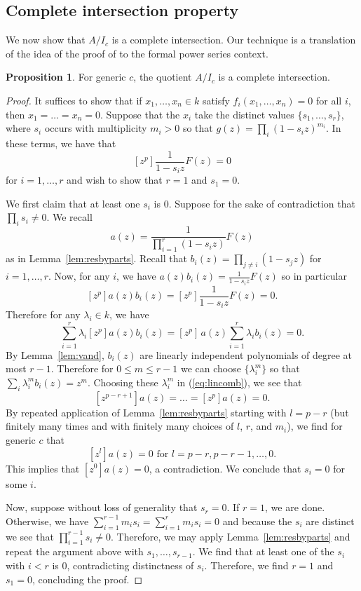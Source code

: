 \documentclass{amsart}
\numberwithin{equation}{section}
\theoremstyle{definition}
\newtheorem{proposition}[theorem]{Proposition}
\begin{document}
\subsection{Complete intersection property}

We now show that $A/I_c$ is a complete intersection.  Our technique is a translation of the idea of the proof of \cite[Theorem 3.2]{CE} to the formal power series context.

\begin{proposition}\label{prop:ci}
For generic $c$, the quotient $A/I_c$ is a complete intersection. 
\end{proposition}
\begin{proof}
It suffices to show that if $x_1,\dots,x_{n} \in k$ satisfy $f_i(x_1,\dots,x_{n})=0$ for all $i$, then $x_1=\dots=x_{n}=0$.  Suppose that the $x_i$ take the distinct values $\{s_1,\dots,s_{r}\}$, where $s_i$ occurs with multiplicity $m_i>0$ so that $g(z)=\prod_i (1-s_iz)^{m_i}$.  In these terms, we have that 
\[
[z^p]\frac{1}{1-s_iz}F(z)= 0
\]
for $i = 1, \ldots, r $ and wish to show that $r=1$ and $s_1=0$. 

We first claim that at least one $s_i$ is $0$. Suppose for the sake of contradiction that $\prod_i s_i \ne 0$.  We recall
\[
a(z)=\frac{1}{\prod_{i=1}^{r}(1-s_iz)}F(z)
\]
as in Lemma~\ref{lem:resbyparts}.  Recall that $b_i(z)=\prod_{j \ne i} (1-s_jz)$ for $i=1,\dots,r$.   Now, for any $i$, we have $a(z)b_i(z)=\frac{1}{1-s_iz}F(z)$ so in particular 
\[
[z^p]a(z)b_i(z)=[z^p]\frac{1}{1-s_iz}F(z)=0.
\]
Therefore for any $\lambda_i \in k$, we have
\begin{equation}\label{eq:lincomb}
\sum_{i=1}^{r} \lambda_i[z^p]a(z)b_i(z)=[z^p] \,a(z)\sum_{i=1}^{r}\lambda_ib_i(z)=0.
\end{equation}
By Lemma~\ref{lem:vand}, $b_i(z)$ are linearly independent polynomials of degree at most $r-1$. Therefore for $0 \le m \le r-1$ we can choose $\{\lambda_i^m\}$ so that $\sum_i\lambda_i^mb_i(z)=z^m$. Choosing these $\lambda_i^m$ in (\ref{eq:lincomb}), we see that
\[
[z^{p-r+1}]a(z)=\dots=[z^p]a(z)=0.
\]
By repeated application of Lemma~\ref{lem:resbyparts} starting with $l=p-r$ (but finitely many times and with finitely many choices of $l$, $r$, and $m_i$), we find for generic $c$ that
\[
[z^l]a(z)=0 \text{ for $l=p-r,p-r-1,\dots,0$}.
\]
This implies that $[z^0]a(z)=0$, a contradiction. We conclude that $s_i=0$ for some $i$.  

Now, suppose without loss of generality that $s_{r}=0$. If $r = 1$, we are done.  Otherwise, we have $\sum_{i=1}^{r-1} m_is_i = \sum_{i=1}^{r} m_is_i = 0$ and because the $s_i$ are distinct we see that $\prod_{i=1}^{r-1} s_i \ne 0$.  Therefore, we may apply Lemma~\ref{lem:resbyparts} and repeat the argument above with $s_1, \ldots, s_{r - 1}$.  We find that at least one of the $s_i$ with $i < r$ is $0$, contradicting distinctness of $s_i$. Therefore, we find $r=1$ and $s_1=0$, concluding the proof.
\end{proof}
\end{document}
